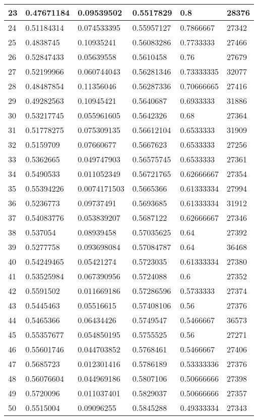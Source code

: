 \begin{longtable}{|l|l|l|l|l|l|}
23 & 0.47671184 & 0.09539502 & 0.5517829 & 0.8 & 28376 \\ \hline 
24 & 0.51184314 & 0.074533395 & 0.55957127 & 0.7866667 & 27342 \\ \hline 
25 & 0.4838745 & 0.10935241 & 0.56083286 & 0.7733333 & 27466 \\ \hline 
26 & 0.52847433 & 0.05639558 & 0.5610458 & 0.76 & 27679 \\ \hline 
27 & 0.52199966 & 0.060744043 & 0.56281346 & 0.73333335 & 32077 \\ \hline 
28 & 0.48487854 & 0.11356046 & 0.56287336 & 0.70666665 & 27416 \\ \hline 
29 & 0.49282563 & 0.10945421 & 0.5640687 & 0.6933333 & 31886 \\ \hline 
30 & 0.53217745 & 0.055961605 & 0.5642326 & 0.68 & 27364 \\ \hline 
31 & 0.51778275 & 0.075309135 & 0.56612104 & 0.6533333 & 31909 \\ \hline 
32 & 0.5159709 & 0.07660677 & 0.5667623 & 0.6533333 & 27256 \\ \hline 
33 & 0.5362665 & 0.049747903 & 0.56575745 & 0.6533333 & 27361 \\ \hline 
34 & 0.5490533 & 0.011052349 & 0.56721765 & 0.62666667 & 27354 \\ \hline 
35 & 0.55394226 & 0.0074171503 & 0.5665366 & 0.61333334 & 27994 \\ \hline 
36 & 0.5236773 & 0.09737491 & 0.5693685 & 0.61333334 & 31912 \\ \hline 
37 & 0.54083776 & 0.053839207 & 0.5687122 & 0.62666667 & 27346 \\ \hline 
38 & 0.537054 & 0.08939458 & 0.57035625 & 0.64 & 27392 \\ \hline 
39 & 0.5277758 & 0.093698084 & 0.57084787 & 0.64 & 36468 \\ \hline 
40 & 0.54249465 & 0.05421274 & 0.5723035 & 0.61333334 & 27380 \\ \hline 
41 & 0.53525984 & 0.067390956 & 0.5724088 & 0.6 & 27352 \\ \hline 
42 & 0.5591502 & 0.011669186 & 0.57286596 & 0.5733333 & 27374 \\ \hline 
43 & 0.5445463 & 0.05516615 & 0.57408106 & 0.56 & 27376 \\ \hline 
44 & 0.5465366 & 0.06434426 & 0.5749547 & 0.5466667 & 36573 \\ \hline 
45 & 0.55357677 & 0.054850195 & 0.5755525 & 0.56 & 27271 \\ \hline 
46 & 0.55601746 & 0.044703852 & 0.5768461 & 0.5466667 & 27406 \\ \hline 
47 & 0.5685723 & 0.012301416 & 0.5786189 & 0.53333336 & 27376 \\ \hline 
48 & 0.56076604 & 0.044969186 & 0.5807106 & 0.50666666 & 27398 \\ \hline 
49 & 0.5720096 & 0.011037401 & 0.5829037 & 0.50666666 & 27357 \\ \hline 
50 & 0.5515004 & 0.09096255 & 0.5845288 & 0.49333334 & 27343 \\ \hline 
\end{longtable}